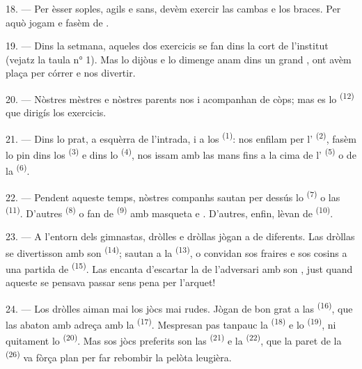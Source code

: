 \VUsaut{5.0mm}
\VUsaut{2.4mm}
\VUsaut{3.0mm}

18. --- Per èsser soples, agils e sans, devèm exercir las cambas e los braces. Per
aquò jogam e fasèm de .

19. --- Dins la setmana, aqueles dos exercicis se fan dins la cort de l'institut
(vejatz la taula n° 1). Mas lo dijòus e lo dimenge anam dins un grand
, ont avèm plaça per córrer e nos divertir.

20. --- Nòstres mèstres e nòstres parents nos i acompanhan de còps; mas es lo
 \textsuperscript{(12)} que dirigís los exercicis.

21. --- Dins lo prat, a esquèrra de l'intrada, i a los  \textsuperscript{(1)}: nos enfilam per l'
\textsuperscript{(2)}, fasèm lo pin dins los 
\textsuperscript{(3)} e dins lo  \textsuperscript{(4)}, nos
issam amb las mans fins a la cima de l'
\textsuperscript{(5)} o de la  \textsuperscript{(6)}.

22. --- Pendent aqueste temps, nòstres companhs sautan per dessús lo
 \textsuperscript{(7)} o las 
\textsuperscript{(11)}. D'autres  \textsuperscript{(8)} o fan de
 \textsuperscript{(9)} amb masqueta e . D'autres,
enfin, lèvan de  \textsuperscript{(10)}.

\VUsaut{4.6mm}
\VUsaut{3.0mm}

23. --- A l'entorn dels gimnastas, dròlles e dròllas jògan a de 
diferents. Las dròllas se divertisson amb son 
\textsuperscript{(14)}; sautan a la  \textsuperscript{(13)}, o
convidan sos fraires e sos cosins a una partida de 
\textsuperscript{(15)}. Las encanta d'escartar la  de l'adversari amb
son , just quand aqueste se pensava passar sens pena per
l'arquet!

24. --- Los dròlles aiman mai los jòcs mai rudes. Jògan de bon grat a las
 \textsuperscript{(16)}, que las abaton amb adreça amb la
 \textsuperscript{(17)}. Mespresan pas tanpauc la 
\textsuperscript{(18)} e lo  \textsuperscript{(19)}, ni
quitament lo  \textsuperscript{(20)}. Mas sos jòcs
preferits son las  \textsuperscript{(21)} e la  \textsuperscript{(22)}, que la paret de la 
\textsuperscript{(26)} va fòrça plan per far rebombir la pelòta leugièra.

